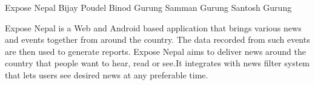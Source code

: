  \begin{conf-abstract}[]
 {Expose Nepal }
 {Bijay Poudel
 	Binod Gurung
 	Samman Gurung
 	Santosh Gurung
 }
{}

Expose Nepal is a Web and Android based application that brings various news and events together from around the country. The data recorded from such events are then used to generate reports. Expose Nepal aims to deliver news around the country that people want to hear, read or see.It integrates with news filter system that lets users see desired news at any preferable time.

 \end{conf-abstract}